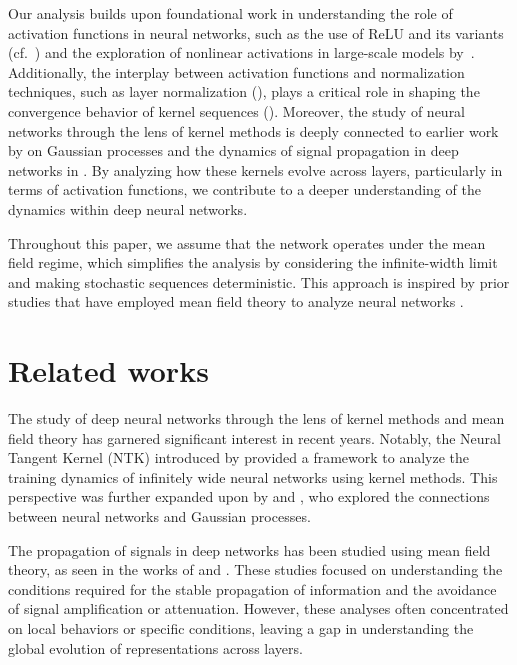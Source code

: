 \documentclass[twoside]{article}
\theoremstyle{definition}
\newcommand{\thomas}[1]{{\color{blue}TH:  \textit{#1}}}
\begin{document}
Our analysis builds upon foundational work in understanding the role of activation functions in neural networks, such as the use of ReLU and its variants (cf.~\citep{glorot2011deep, nair2010rectified}) and the exploration of nonlinear activations in large-scale models by~\citep{ramachandran2017searching, clevert2015fast}. Additionally, the interplay between activation functions and normalization techniques, such as layer normalization (\citep{ba2016layer}), plays a critical role in shaping the convergence behavior of kernel sequences (\citep{klambauer2017self, hayou2019impact}). Moreover, the study of neural networks through the lens of kernel methods is deeply connected to earlier work by \citep{williams2006gaussian} on Gaussian processes and the dynamics of signal propagation in deep networks in \citep{poole2016exponential, raghu2017expressive}. By analyzing how these kernels evolve across layers, particularly in terms of activation functions, we contribute to a deeper understanding of the dynamics within deep neural networks.

Throughout this paper, we assume that the network operates under the mean field regime, which simplifies the analysis by considering the infinite-width limit and making stochastic sequences deterministic. This approach is inspired by prior studies that have employed mean field theory to analyze neural networks \citep{poole2016exponential, yang2019meanfield, mei2019mean}.

\section{Related works}
The study of deep neural networks through the lens of kernel methods and mean field theory has garnered significant interest in recent years. Notably, the Neural Tangent Kernel (NTK) introduced by \citet{jacot2018neural} provided a framework to analyze the training dynamics of infinitely wide neural networks using kernel methods. This perspective was further expanded upon by \citet{lee2019wide} and \citet{arora2019exact}, who explored the connections between neural networks and Gaussian processes.

The propagation of signals in deep networks has been studied using mean field theory, as seen in the works of \citet{schoenholz2016deep} and \citet{pennington2017resurrecting}. These studies focused on understanding the conditions required for the stable propagation of information and the avoidance of signal amplification or attenuation. However, these analyses often concentrated on local behaviors or specific conditions, leaving a gap in understanding the global evolution of representations across layers.
\end{document}
